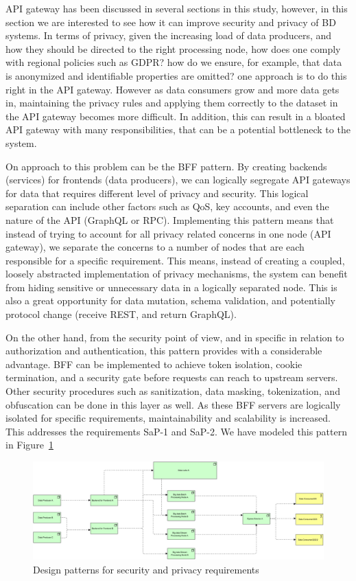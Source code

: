 \documentclass{bmcart}
\begin{document}
API gateway has been discussed in several sections in this study, however, in this section we are interested to see how it can improve security and privacy of BD systems. In terms of privacy, given the increasing load of data producers, and how they should be directed to the right processing node, how does one comply with regional policies such as GDPR? how do we ensure, for example, that data is anonymized and identifiable properties are omitted? one approach is to do this right in the API gateway. However as data consumers grow and more data gets in, maintaining the privacy rules and applying them correctly to the dataset in the API gateway becomes more difficult. In addition, this can result in a bloated API gateway with many responsibilities, that can be a potential bottleneck to the system.

On approach to this problem can be the BFF pattern. By creating backends (services) for frontends (data producers), we can logically segregate API gateways for data that requires different level of privacy and security. This logical separation can include other factors such as QoS, key accounts, and even the nature of the API (GraphQL or RPC). Implementing this pattern means that instead of trying to account for all privacy related concerns in one node (API gateway), we separate the concerns to a number of nodes that are each responsible for a specific requirement. This means, instead of creating a coupled, loosely abstracted implementation of privacy mechanisms, the system can benefit from hiding sensitive or unnecessary data in a logically separated node. This is also a great opportunity for data mutation, schema validation, and potentially protocol change (receive REST, and return GraphQL).

On the other hand, from the security point of view, and in specific in relation to authorization and authentication, this pattern provides with a considerable advantage. BFF can be implemented to achieve token isolation, cookie termination, and a security gate before requests can reach to upstream servers. Other security procedures such as sanitization, data masking, tokenization, and obfuscation can be done in this layer as well. As these BFF servers are logically isolated for specific requirements, maintainability and scalability is increased. This addresses the requirements SaP-1 and SaP-2. We have modeled this pattern in Figure~\ref{fig:SaP Requirements}

\begin{figure}[h]
  \includegraphics[width=12cm]{Media/Privacy and Security Requirements.jpg}
  \caption[]{Design patterns for security and privacy requirements}
  \label{fig:SaP Requirements}
\end{figure}
\end{document}
